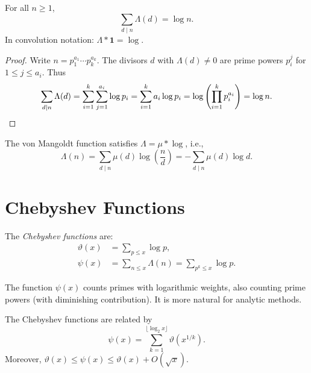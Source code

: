 \begin{proposition}
  For all $n \geq 1$,
  \begin{equation}
    \sum_{d \mid n} \Lambda(d) = \log n.
  \end{equation}
  In convolution notation: $\Lambda * \mathbf{1} = \log$.
\end{proposition}

\begin{proof}
  Write $n = p_1^{a_1} \cdots p_k^{a_k}$. The divisors $d$ with $\Lambda(d) \neq 0$ are prime powers $p_i^j$ for $1 \leq j \leq a_i$. Thus
  \begin{equation}
    \sum_{d \mid n} \Lambda(d) = \sum_{i=1}^{k} \sum_{j=1}^{a_i} \log p_i = \sum_{i=1}^{k} a_i \log p_i = \log\left(\prod_{i=1}^{k} p_i^{a_i}\right) = \log n. \qedhere
  \end{equation}
\end{proof}

\begin{corollary}
  The von Mangoldt function satisfies $\Lambda = \mu * \log$, i.e.,
  \begin{equation}
    \Lambda(n) = \sum_{d \mid n} \mu(d) \log\left(\frac{n}{d}\right) = -\sum_{d \mid n} \mu(d) \log d.
  \end{equation}
\end{corollary}

\section{Chebyshev Functions}

\begin{definition}
  The \emph{Chebyshev functions} are:
  \begin{align}
    \vartheta(x) & = \sum_{p \leq x} \log p,                                \\
    \psi(x)      & = \sum_{n \leq x} \Lambda(n) = \sum_{p^k \leq x} \log p.
  \end{align}
\end{definition}

\begin{remark}
  The function $\psi(x)$ counts primes with logarithmic weights, also counting prime powers (with diminishing contribution). It is more natural for analytic methods.
\end{remark}

\begin{proposition}
  The Chebyshev functions are related by
  \begin{equation}
    \psi(x) = \sum_{k=1}^{\lfloor \log_2 x \rfloor} \vartheta(x^{1/k}).
  \end{equation}
  Moreover, $\vartheta(x) \leq \psi(x) \leq \vartheta(x) + O(\sqrt{x})$.
\end{proposition}


